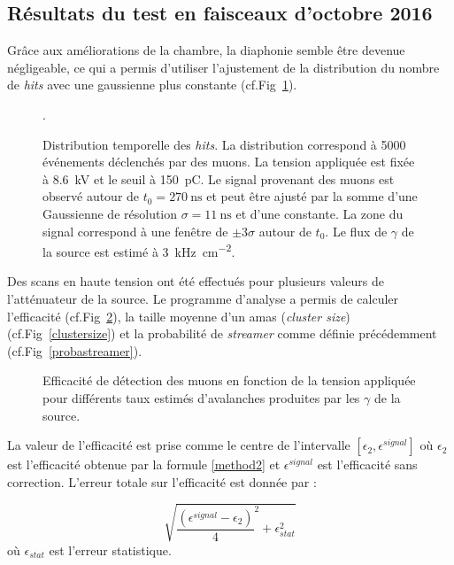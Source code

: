 \subsection{Résultats du test en faisceaux d'octobre 2016}
\label{GIFFF4}
Grâce aux améliorations de la chambre, la diaphonie semble être devenue négligeable, ce qui a permis d'utiliser l'ajustement de la distribution du nombre de \textit{hits} avec une gaussienne plus constante (cf.Fig~\ref{ajust}).
\begin{figure}[!ht]
	\centering
	\caption{Distribution temporelle des \textit{hits}. La distribution correspond à \num{5000} événements déclenchés par des muons. La tension appliquée est fixée à \SI{8.6}{\kilo\volt} et le seuil à \SI{150}{\pico\coulomb}. Le signal provenant des muons est observé autour de $t_0=\SI{270}{\nano\second}$ et peut être ajusté par la somme d'une Gaussienne de résolution $\sigma=\SI{11}{\nano\second}$ et d'une constante. La zone du signal correspond à une fenêtre de $\pm 3 \sigma$ autour de $t_0$. Le flux de $\gamma$ de la source est estimé à \SI{3}{\kilo\hertz\per\square\centi\meter}.}.
	\label{ajust}
\end{figure}

 Des scans en haute tension ont été effectués pour plusieurs valeurs de l'atténuateur de la source. Le programme d'analyse a permis de calculer l'efficacité (cf.Fig~\ref{effifi}), la taille moyenne d'un amas (\textit{cluster size}) (cf.Fig~\ref{clustersize}) et la probabilité de \textit{streamer} comme définie précédemment (cf.Fig~\ref{probastreamer}).

 \begin{figure}[!ht]
 	\centering
 	\caption{Efficacité de détection des muons en fonction de la tension appliquée pour différents taux estimés d'avalanches produites par les $\gamma$ de la source.}
 	\label{effifi}
 \end{figure}

\newpage
La valeur de l'efficacité est prise comme le centre de l'intervalle $\left[\epsilon_2,\epsilon^{signal}\right]$ où $\epsilon_2$ est l'efficacité obtenue par la formule \ref{method2} et $\epsilon^{signal}$ est l'efficacité sans correction. L'erreur totale sur l'efficacité est donnée par :

\begin{equation}
\sqrt{{\frac{\left(\epsilon^{signal}-\epsilon_2\right)}{4}}^2+\epsilon_{stat}^2}
\end{equation}
où $\epsilon_{stat}$ est l'erreur statistique.

